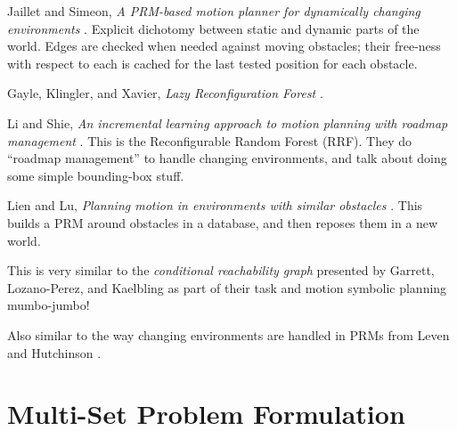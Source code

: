 \documentclass{report}
\begin{document}
Jaillet and Simeon,
\emph{A PRM-based motion planner for dynamically changing environments}
\cite{jaillet2004dynamicprm}.
Explicit dichotomy between static and dynamic parts of the world.
Edges are checked when needed against moving obstacles;
their free-ness with respect to each is cached for the last tested position
for each obstacle.

Gayle, Klingler, and Xavier,
\emph{Lazy Reconfiguration Forest}
\cite{gayle2007lazyreconfigforest}.

Li and Shie,
\emph{An incremental learning approach to motion planning with
      roadmap management}
\cite{li2002incrementalprmmanagement}.
This is the Reconfigurable Random Forest (RRF).
They do ``roadmap management'' to handle changing environments,
and talk about doing some simple bounding-box stuff.

Lien and Lu,
\emph{Planning motion in environments with similar obstacles}
\cite{lien2009similarobstacles}.
This builds a PRM around obstacles in a database,
and then reposes them in a new world.

This is very similar to the \emph{conditional reachability graph}
presented by Garrett, Lozano-Perez, and Kaelbling
\cite{garrett2014ffrob}
as part of their task and motion symbolic planning mumbo-jumbo!

Also similar to the way changing environments are handled in PRMs
from Leven and Hutchinson \cite{leven2002changing}.

\section{Multi-Set Problem Formulation}
\label{sec:multi-set}
\end{document}
